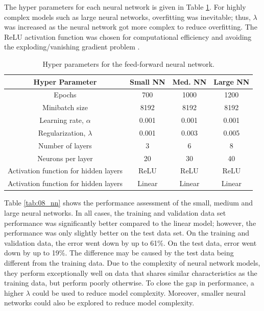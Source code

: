The hyper parameters for each neural network is given in Table \ref{tab:08NN_hp}. For highly complex models such as large neural networks, overfitting was inevitable; thus, $\lambda$ was increased as the neural network got more complex to reduce overfitting.  The ReLU activation function was chosen for computational efficiency and avoiding the exploding/vanishing gradient problem \cite{ReLU}.
\begin{table}[h]
    \centering
    {
    \begin{tabular}{ c | c | c | c}
        Hyper Parameter                            &  Small NN  &  Med. NN  & Large NN       \\
        \hline
        Epochs                                     &  700       & 1000      & 1200  \\
        Minibatch size                             &  8192      & 8192      & 8192  \\
        Learning rate, $\alpha$                    &  0.001     & 0.001     & 0.001 \\
        Regularization, $\lambda$                  &  0.001     & 0.003     & 0.005 \\
        Number of layers                           &  3         & 6         & 8     \\
        Neurons per layer                          &  20        & 30        & 40    \\
        Activation function for hidden layers      & ReLU       & ReLU      & ReLU  \\
        Activation function for hidden layers      & Linear     & Linear    & Linear \\
    \end{tabular}}
    \caption{Hyper parameters for the feed-forward neural network.}
    \label{tab:08NN_hp}
\end{table}

Table \ref{tab:08_nn} shows the performance assessment of the small, medium and large neural networks.  In all cases, the training and validation data set performance was significantly better compared to the linear model; however, the performance was only slightly better on the test data set. On the training and validation data, the error went down by up to 61\%.  On the test data, error went down by up to 19\%. The difference may be caused by the test data being different from the training data.  Due to the complexity of neural network models, they perform exceptionally well on data that shares similar characteristics as the training data, but perform poorly otherwise. To close the gap in performance, a higher $\lambda$ could be used to reduce model complexity.  Moreover, smaller neural networks could also be explored to reduce model complexity.

